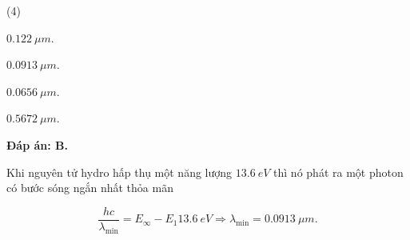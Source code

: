 \begin{enumerate}[label=\bfseries Câu \arabic*:]
{		
	}
	
	\loigiai
	{		\textbf{Đáp án: B.}
		
		Khi nguyên tử hydro hấp thụ một năng lượng $\SI{13,6}{eV}$ thì nó phát ra một photon có bước sóng ngắn nhất thỏa mãn
		
		$$\dfrac{hc}{\lambda_\text{min}} = E_\infty - E_1 \SI{13,6}{eV} \Rightarrow \lambda_\text{min} = \SI{0,0913}{\mu m}.$$ 
	}	

\end{enumerate}

